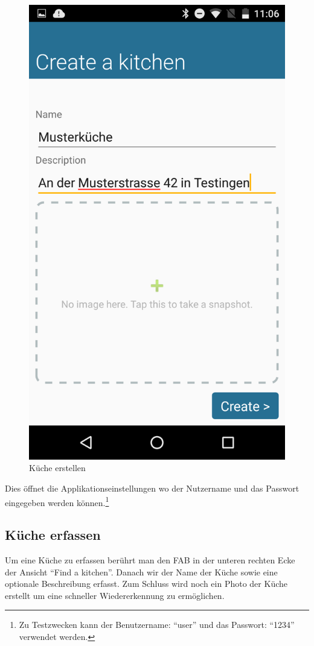\begin{figure}
	\includegraphics[scale=0.13]{results/res/create_kitchen}
	\caption{Küche erstellen}
\end{figure}
Dies öffnet die Applikationseinstellungen wo der Nutzername und das Passwort eingegeben werden können.\footnote{Zu Testzwecken kann der Benutzername: \enquote{user} und das Passwort: \enquote{1234} verwendet werden.}

\subsection{Küche erfassen}
Um eine Küche zu erfassen berührt man den \acl{FAB} in der unteren rechten Ecke der Ansicht \enquote{Find a kitchen}. Danach wir der Name der Küche sowie eine optionale Beschreibung erfasst. Zum Schluss wird noch ein Photo der Küche erstellt um eine schneller Wiedererkennung zu ermöglichen.

